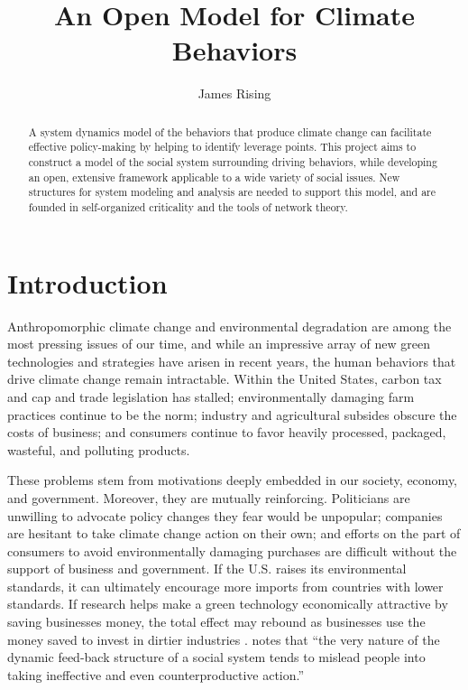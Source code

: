 \documentclass[12pt, oneside]{amsart}
\title{An Open Model for Climate Behaviors}
\author{James Rising}
\begin{document}
\maketitle

\begin{abstract}
A system dynamics model of the behaviors that produce climate change can facilitate effective policy-making by helping to identify leverage points.  This project aims to construct a model of the social system surrounding driving behaviors, while developing an open, extensive framework applicable to a wide variety of social issues.  New structures for system modeling and analysis are needed to support this model, and are founded in self-organized criticality and the tools of network theory.
\end{abstract}

\section{Introduction}

Anthropomorphic climate change and environmental degradation are among the most pressing issues of our time, and while an impressive array of new green technologies and strategies have arisen in recent years, the human behaviors that drive climate change remain intractable.  Within the United States, carbon tax and cap and trade legislation has stalled; environmentally damaging farm practices continue to be the norm; industry and agricultural subsides obscure the costs of business; and consumers continue to favor heavily processed, packaged, wasteful, and polluting products.

These problems stem from motivations deeply embedded in our society, economy, and government.  Moreover, they are mutually reinforcing.  Politicians are unwilling to advocate policy changes they fear would be unpopular; companies are hesitant to take climate change action on their own; and efforts on the part of consumers to avoid environmentally damaging purchases are difficult without the support of business and government.  If the U.S. raises its environmental standards, it can ultimately encourage more imports from countries with lower standards.  If research helps make a green technology economically attractive by saving businesses money, the total effect may rebound as businesses use the money saved to invest in dirtier industries \citep{greening2000energy}.  \cite{Forrester1991} notes that ``the very nature of the dynamic feed-back structure of a social system tends to mislead people into taking ineffective and even counterproductive action.''
\end{document}

